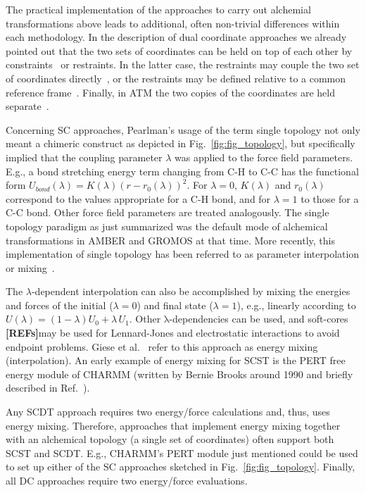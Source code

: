 \documentclass[9pt,bestpractices]{livecoms}
\newcommand{\rref}{{\bfseries[REFs]}{}}
\begin{document}
The practical implementation of the approaches to carry out alchemial transformations above leads to additional, often non-trivial differences within each methodology. In the description of dual coordinate approaches we already pointed out that the two sets of coordinates can be held on top of each other by constraints~\cite{jiang2019computing,lee2023aces} or restraints. In the latter case, the restraints may couple the two set of coordinates directly~\cite{Axelsen_1998,Ries_2022}, or the restraints may be defined relative to a common reference frame~\cite{rocklin2013separated,Baumann_2023}. Finally, in ATM the two copies of the coordinates are held separate~\cite{azimi2022relative}.

Concerning SC approaches, Pearlman’s usage of the term single topology not only meant a chimeric construct as depicted in Fig.~\ref{fig:fig_topology}, but specifically implied that the coupling parameter $\lambda$ was applied to the force field parameters. E.g., a bond stretching energy term changing from C-H to C-C has the functional form $U_{bond}(\lambda)=K(\lambda)(r-r_0(\lambda))^2$. For $\lambda=0$, $K(\lambda)$ and $r_0(\lambda)$ correspond to the values appropriate for a C-H bond, and for $\lambda=1$ to those for a C-C bond. Other force field parameters are treated analogously. The single topology paradigm as just summarized was the default mode of alchemical transformations in AMBER and GROMOS at that time.  More recently, this implementation of single topology has been referred to as parameter interpolation or mixing~\cite{Giese_2018}. 

The $\lambda$-dependent interpolation can also be accomplished by mixing the energies and forces of the initial ($\lambda=0$) and final state ($\lambda=1$), e.g., linearly according to $U(\lambda)=(1-\lambda) U_0+\lambda\,U_1$. Other $\mathrm{λ}$-dependencies can be used, and soft-cores \rref may be used for Lennard-Jones and electrostatic interactions to avoid endpoint problems. Giese et al.~\cite{Giese_2018} refer to this approach as energy mixing (interpolation).%
An early example of energy mixing for SCST is the PERT free energy module of CHARMM (written by Bernie Brooks around 1990 and briefly described in Ref.~\cite{brooks_2009}).

Any SCDT approach requires two energy/force calculations and, thus, uses energy mixing. Therefore, approaches that implement energy mixing together with an alchemical topology (a single set of coordinates) often support both SCST and SCDT. E.g., CHARMM's PERT module just mentioned could be used to set up either of the SC approaches sketched in Fig.~\ref{fig:fig_topology}. Finally, all DC approaches require two energy/force evaluations.
\end{document}

